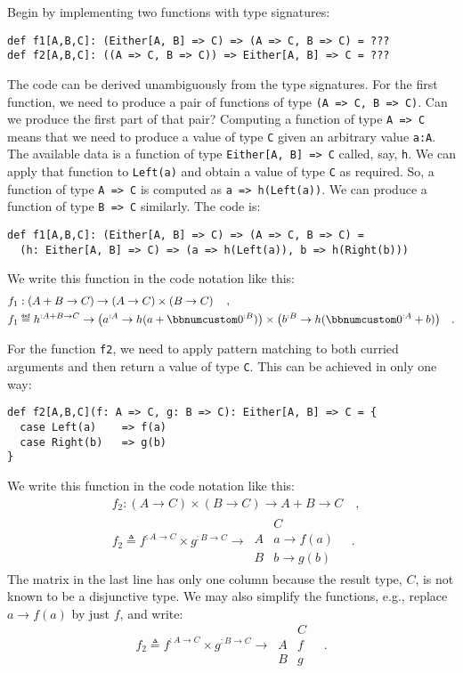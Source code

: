Begin by implementing two functions with type signatures:
\begin{lstlisting}
def f1[A,B,C]: (Either[A, B] => C) => (A => C, B => C) = ???
def f2[A,B,C]: ((A => C, B => C)) => Either[A, B] => C = ???
\end{lstlisting}
The code can be derived unambiguously from the type signatures. For
the first function, we need to produce a pair of functions of type
\lstinline!(A => C, B => C)!. Can we produce the first part of that
pair? Computing a function of type \lstinline!A => C! means that
we need to produce a value of type \lstinline!C! given an arbitrary
value \lstinline!a:A!. The available data is a function of type \lstinline!Either[A, B] => C!
called, say, \lstinline!h!. We can apply that function to \lstinline!Left(a)!
and obtain a value of type \lstinline!C! as required. So, a function
of type \lstinline!A => C! is computed as \lstinline!a => h(Left(a))!.
We can produce a function of type \lstinline!B => C! similarly. The
code is:
\begin{lstlisting}
def f1[A,B,C]: (Either[A, B] => C) => (A => C, B => C) =
  (h: Either[A, B] => C) => (a => h(Left(a)), b => h(Right(b)))
\end{lstlisting}
We write this function in the code notation like this:
\begin{align*}
 & f_{1}:\left(A+B\rightarrow C\right)\rightarrow\left(A\rightarrow C\right)\times\left(B\rightarrow C\right)\quad,\\
 & f_{1}\triangleq h^{:A+B\rightarrow C}\rightarrow\big(a^{:A}\rightarrow h(a+\bbnum 0^{:B})\big)\times\big(b^{:B}\rightarrow h(\bbnum 0^{:A}+b)\big)\quad.
\end{align*}

For the function \lstinline!f2!, we need to apply pattern matching
to both curried arguments and then return a value of type \lstinline!C!.
This can be achieved in only one way:
\begin{lstlisting}
def f2[A,B,C](f: A => C, g: B => C): Either[A, B] => C = {
  case Left(a)    => f(a)
  case Right(b)   => g(b)
}
\end{lstlisting}
We write this function in the code notation like this:
\begin{align*}
 & f_{2}:\left(A\rightarrow C\right)\times\left(B\rightarrow C\right)\rightarrow A+B\rightarrow C\quad,\\
 & f_{2}\triangleq f^{:A\rightarrow C}\times g^{:B\rightarrow C}\rightarrow\,\begin{array}{|c||c|}
 & C\\
\hline A & a\rightarrow f(a)\\
B & b\rightarrow g(b)
\end{array}\quad.
\end{align*}
The matrix in the last line has only one column because the result
type, $C$, is not known to be a disjunctive type. We may also simplify
the functions, e.g., replace $a\rightarrow f(a)$ by just $f$, and
write:
\[
f_{2}\triangleq f^{:A\rightarrow C}\times g^{:B\rightarrow C}\rightarrow\,\begin{array}{|c||c|}
 & C\\
\hline A & f\\
B & g
\end{array}\quad.
\]

